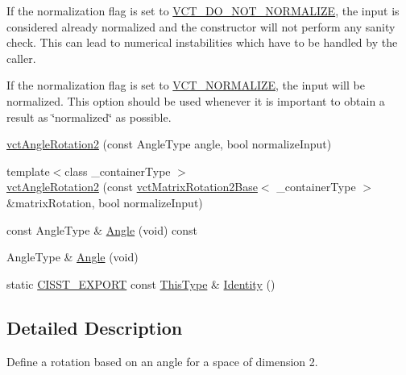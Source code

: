 \begin{DoxyItemize}
\item If the normalization flag is set to \hyperlink{vct_forward_declarations_8h_a6fd516b0c35fa9967b4da5f03a788985}{V\+C\+T\+\_\+\+D\+O\+\_\+\+N\+O\+T\+\_\+\+N\+O\+R\+M\+A\+L\+I\+Z\+E}, the input is considered already normalized and the constructor will not perform any sanity check. This can lead to numerical instabilities which have to be handled by the caller.


\item If the normalization flag is set to \hyperlink{vct_forward_declarations_8h_ae54c682b919a7c5743ea498810518565}{V\+C\+T\+\_\+\+N\+O\+R\+M\+A\+L\+I\+Z\+E}, the input will be normalized. This option should be used whenever it is important to obtain a result as \char`\"{}normalized\char`\"{} as possible.


\end{DoxyItemize}\begin{DoxyCompactItemize}
\item 
\hyperlink{classvct_angle_rotation2_abf791aa494a888d6be11c4f35b461c89}{vct\+Angle\+Rotation2} (const Angle\+Type angle, bool normalize\+Input)
\item 
{\footnotesize template$<$class \+\_\+container\+Type $>$ }\\\hyperlink{classvct_angle_rotation2_ae2257fcc5c4f219dc7a06e9487de506c}{vct\+Angle\+Rotation2} (const \hyperlink{classvct_matrix_rotation2_base}{vct\+Matrix\+Rotation2\+Base}$<$ \+\_\+container\+Type $>$ \&matrix\+Rotation, bool normalize\+Input)
\item 
const Angle\+Type \& \hyperlink{classvct_angle_rotation2_a2d928d5eec6f93effa4e22c9a58b90ba}{Angle} (void) const 
\item 
Angle\+Type \& \hyperlink{classvct_angle_rotation2_a09fa3b9be3e5506a752c864a84fad4ee}{Angle} (void)
\item 
static \hyperlink{cmn_export_macros_8h_a99393e0c3ac434b2605235bbe20684f8}{C\+I\+S\+S\+T\+\_\+\+E\+X\+P\+O\+R\+T} const \hyperlink{classvct_angle_rotation2_a67339254f084f89c13aca70c1242d18e}{This\+Type} \& \hyperlink{classvct_angle_rotation2_afcd81f0cfc0aababc993b1407af93d29}{Identity} ()
\end{DoxyCompactItemize}


\subsection{Detailed Description}
Define a rotation based on an angle for a space of dimension 2. 

